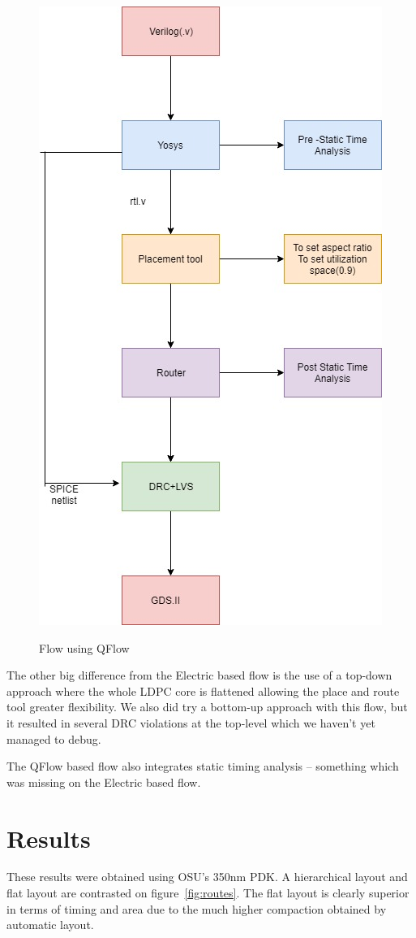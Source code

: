 \documentclass[11pt, a4paper]{article}
\begin{document}
\begin{figure}[hbt]
\includegraphics[scale=0.5]{FLOW2.jpg}
\label{fig:flow-q}
\caption{Flow using QFlow}
\end{figure}

The other big difference from the Electric based flow is the use of a top-down
approach where the whole LDPC core is flattened allowing the place and route
tool greater flexibility. We also did try a bottom-up approach with this flow,
but it resulted in several DRC violations at the top-level which we haven't
yet managed to debug.

The QFlow based flow also integrates static timing analysis -- something which
was missing on the Electric based flow. 

\section{Results}
These results were obtained using OSU's 350nm PDK. A hierarchical layout and
flat layout are contrasted on figure~\ref{fig:routes}. The flat layout is
clearly superior in terms of timing and area due to the much higher compaction
obtained by automatic layout.
\end{document}
